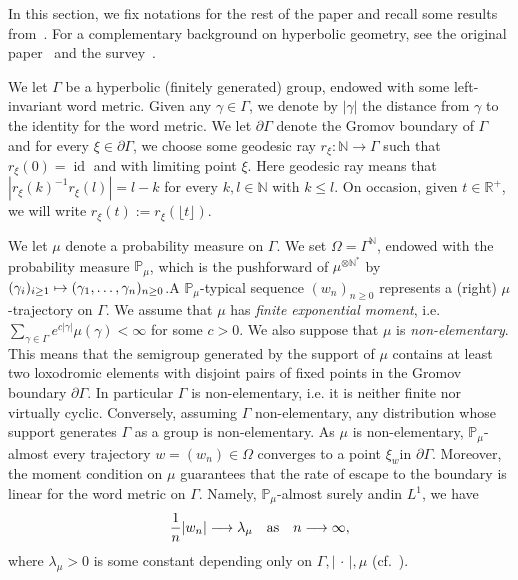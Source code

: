 \documentclass[10pt]{amsart}
\theoremstyle{definition}\newtheorem{defi}[theo]{Definition}\newtheorem{rema}[theo]{Remark}\newtheorem{exam}[theo]{Example}\newtheorem{exem}[theo]{Example}\newtheorem{nota}[theo]{Notation}
\DeclareMathOperator{\id}{id}
\newcommand{\N}{\mathbb{N}}
\newcommand{\R}{\mathbb{R}}
\renewcommand{\Pr}{\mathbb{P}}
\renewcommand{\(}{\left(}
\renewcommand{\)}{\right)}
\renewcommand*{\to}{\mathchoice{\longrightarrow}{\rightarrow}{\rightarrow}{\rightarrow}}
\let\oldmapsto\mapsto
\renewcommand*{\mapsto}{\mathchoice{\longmapsto}{\oldmapsto}{\oldmapsto}{\oldmapsto}}
\begin{document}
In this section, we fix notations for the rest of the paper and recall some results from~\cite{BenardWinding}. For a complementary background on hyperbolic geometry, see the original paper~\cite{GromovHyperbolic} and the survey~\cite{Calegari}.


We let $\Gamma$ be a hyperbolic (finitely generated) group, endowed with some left-invariant word metric. Given any $\gamma\in \Gamma$, we denote by $|\gamma|$ the distance from $\gamma$ to the identity for the word metric. We let $\partial \Gamma$ denote the Gromov boundary of $\Gamma$ and for every $\xi\in \partial \Gamma$, we choose some geodesic ray $r_{\xi}:\N\rightarrow \Gamma$ such that $r_{\xi}(0)=\id$ and with limiting point $\xi$. Here geodesic ray means that $|r_{\xi}(k)^{-1}r_{\xi}(l)|=l-k$ for every $k,l\in \N$ with $k\leq l$. On occasion, given $t\in \R^+$, we will write $r_{\xi}(t):=r_{\xi}(\lfloor t \rfloor)$.


We let $\mu$ denote a probability measure on $\Gamma$. We set $\Omega =\Gamma^\N$, endowed with the probability measure $\Pr_{\mu}$, which is the pushforward of $\mu^{\otimes \N^{*}}$ by $(\gamma_{i})_{i\geq 1}\mapsto (\gamma_{1},\dots,\gamma_{n})_{n\geq 0}$.\linebreak A $\Pr_{\mu}$-typical sequence $(w_n)_{n \geq 0}$ represents a (right) $\mu$-trajectory on $\Gamma$. We assume that $\mu$ has \emph{finite exponential moment}, i.e. $\sum_{\gamma\in \Gamma}e^{c| \gamma|}\mu(\gamma)<\infty$ for some $c>0$. We also suppose that $\mu$ is \emph{non-elementary}. This means that the semigroup generated by the support of $\mu$ contains at least two loxodromic elements with disjoint pairs of fixed points in the Gromov boundary $\partial \Gamma$. In particular $\Gamma$ is non-elementary, i.e. it is neither finite nor virtually cyclic. Conversely, assuming $\Gamma$ non-elementary, any distribution whose support generates $\Gamma$ as a group is non-elementary. As $\mu$ is non-elementary, $\Pr_{\mu}$-almost every trajectory $w=(w_{n})\in \Omega$ converges to a point $\xi_{w}$\linebreak in $\partial \Gamma$. Moreover, the moment condition on $\mu$ guarantees that the rate of escape to the boundary is linear for the word metric on $\Gamma$. Namely, $\Pr_{\mu}$-almost surely and\linebreak in $L^1$, we have
\begin{equation}\label{Eq:Kingman}
\frac{1}{n}|w_n|\to \lambda_\mu \quad \text{as}\quad n \to \infty,
\end{equation}
where $\lambda_\mu >0$ is some constant depending only on $\Gamma, |\,\cdot\,|, \mu$ (cf.~\cite[Section~7.1]{BMSS}).
\end{document}

